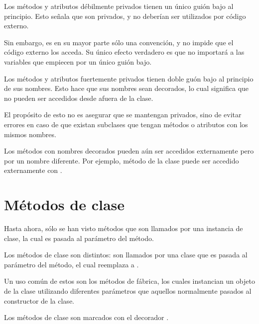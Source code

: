 Los métodos y atributos débilmente privados tienen un único guión bajo al principio.
Esto señala que son privados, y no deberían ser utilizados por código externo.
\medskip



Sin embargo, es en su mayor parte sólo una convención, y no impide que el código externo los acceda.
Su único efecto verdadero es que  no importará a las variables que empiecen por un único guión bajo.


Los métodos y atributos fuertemente privados tienen doble guón bajo al principio de sus nombres.
Esto hace que sus nombres sean decorados, lo cual significa que no pueden ser accedidos desde afuera de la clase.
\medskip

El propósito de esto no es asegurar que se mantengan privados, sino de evitar errores en caso de que existan subclases que tengan métodos o atributos con los mismos nombres.
\medskip

Los métodos con nombres decorados pueden aún ser accedidos externamente pero por un nombre diferente.
Por ejemplo, método  de la clase  puede ser accedido externamente con .


\section{Métodos de clase}

Hasta ahora, sólo se han visto métodos que son llamados por una instancia de clase, la cual es pasada al parámetro  del método.
\medskip

Los métodos de clase son distintos: son llamados por una clase que es pasada al parámetro  del método, el cual reemplaza a .
\medskip

Un uso común de estos son los métodos de fábrica, los cuales instancian un objeto de la clase utilizando diferentes parámetros que aquellos normalmente pasados al constructor de la clase.
\medskip

Los métodos de clase son marcados con el decorador .

